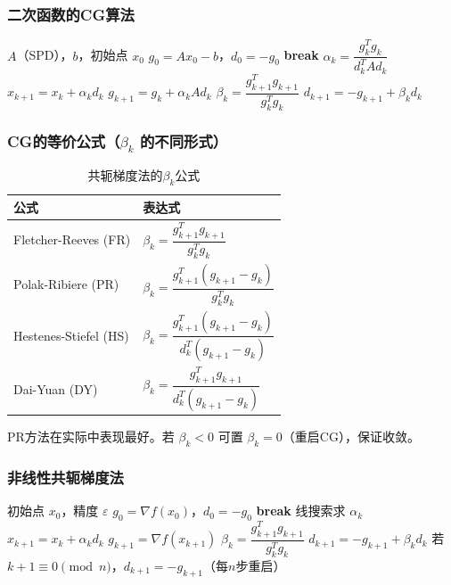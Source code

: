 \subsubsection{二次函数的CG算法}

\begin{algorithm}[H]
\caption{线性共轭梯度法}
\begin{algorithmic}[1]
\Require $A$（SPD），$b$，初始点 $x_0$
\State $g_0 = Ax_0 - b$，$d_0 = -g_0$
     \textbf{break} \EndIf
    \State $\alpha_k = \dfrac{g_k^T g_k}{d_k^T A d_k}$
    \State $x_{k+1} = x_k + \alpha_k d_k$
    \State $g_{k+1} = g_k + \alpha_k A d_k$
    \State $\beta_k = \dfrac{g_{k+1}^T g_{k+1}}{g_k^T g_k}$
    \State $d_{k+1} = -g_{k+1} + \beta_k d_k$
\EndFor
\end{algorithmic}
\end{algorithm}

\subsubsection{CG的等价公式（$\beta_k$ 的不同形式）}

\begin{table}[H]
\centering
\caption{共轭梯度法的$\beta_k$公式}
\begin{tabular}{@{}ll@{}}
\toprule
\textbf{公式} & \textbf{表达式} \\
\midrule
Fletcher-Reeves (FR) & $\beta_k = \dfrac{g_{k+1}^T g_{k+1}}{g_k^T g_k}$ \\
Polak-Ribiere (PR) & $\beta_k = \dfrac{g_{k+1}^T(g_{k+1} - g_k)}{g_k^T g_k}$ \\
Hestenes-Stiefel (HS) & $\beta_k = \dfrac{g_{k+1}^T(g_{k+1} - g_k)}{d_k^T(g_{k+1} - g_k)}$ \\
Dai-Yuan (DY) & $\beta_k = \dfrac{g_{k+1}^T g_{k+1}}{d_k^T(g_{k+1} - g_k)}$ \\
\bottomrule
\end{tabular}
\end{table}

\begin{notebox}[PR方法]
PR方法在实际中表现最好。若 $\beta_k < 0$ 可置 $\beta_k = 0$（重启CG），保证收敛。
\end{notebox}

\subsubsection{非线性共轭梯度法}

\begin{algorithm}[H]
\caption{非线性共轭梯度法（Fletcher-Reeves）}
\begin{algorithmic}[1]
\Require 初始点 $x_0$，精度 $\varepsilon$
\State $g_0 = \nabla f(x_0)$，$d_0 = -g_0$
     \textbf{break} \EndIf
    \State 线搜索求 $\alpha_k$
    \State $x_{k+1} = x_k + \alpha_k d_k$
    \State $g_{k+1} = \nabla f(x_{k+1})$
    \State $\beta_k = \dfrac{g_{k+1}^T g_{k+1}}{g_k^T g_k}$
    \State $d_{k+1} = -g_{k+1} + \beta_k d_k$
    \State 若 $k+1 \equiv 0 \pmod n$，$d_{k+1} = -g_{k+1}$（每$n$步重启）
\EndFor
\end{algorithmic}
\end{algorithm}

